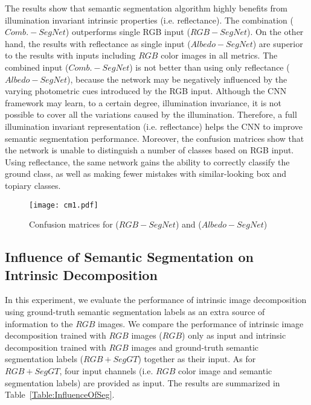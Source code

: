 \documentclass[runningheads]{llncs}
\begin{document}
\begin{table}[]
\centering
\caption{Semantic segmentation accuracy using albedo and $RGB$ images as inputs. Using albedo images significantly outperforms $RGB$ images}
\label{Table:Segmentation}
\end{table}

\noindent The results show that semantic segmentation algorithm highly benefits from illumination invariant intrinsic properties (i.e. reflectance). The combination ($Comb.-SegNet$) outperforms single RGB input ($RGB-SegNet$). On the other hand, the results with reflectance as single input ($Albedo-SegNet$) are superior to the results with inputs including $RGB$ color images in all metrics. The combined input ($Comb.-SegNet$) is not better than using only reflectance ($Albedo-SegNet$), because the network may be negatively influenced by the varying photometric cues introduced by the RGB input. Although the CNN framework may learn, to a certain degree, illumination invariance, it is not possible to cover all the variations caused by the illumination. Therefore, a full illumination invariant representation (i.e. reflectance) helps the CNN to improve semantic segmentation performance. Moreover, the confusion matrices show that the network is unable to distinguish a number of classes based on RGB input. Using reflectance, the same network gains the ability to correctly classify the ground class, as well as making fewer mistakes with similar-looking box and topiary classes.

\begin{figure}[t]
    \centering
    \texttt{[image: cm1.pdf]}
    \caption{Confusion matrices for ($RGB-SegNet$) and ($Albedo-SegNet$)}
    \label{fig:cm1}
\end{figure}

\subsection{Influence of Semantic Segmentation on Intrinsic Decomposition}
In this experiment, we evaluate the performance of intrinsic image decomposition using ground-truth semantic segmentation labels as an extra source of information to the $RGB$ images. We compare the performance of intrinsic image decomposition trained with $RGB$ images ($RGB$) only as input and intrinsic decomposition trained with $RGB$ images and ground-truth semantic segmentation labels ($RGB+SegGT$) together as their input. As for $RGB+SegGT$, four input channels (i.e. $RGB$ color image and semantic segmentation labels) are provided as input. The results are summarized in Table~\ref{Table:InfluenceOfSeg}.
\end{document}
